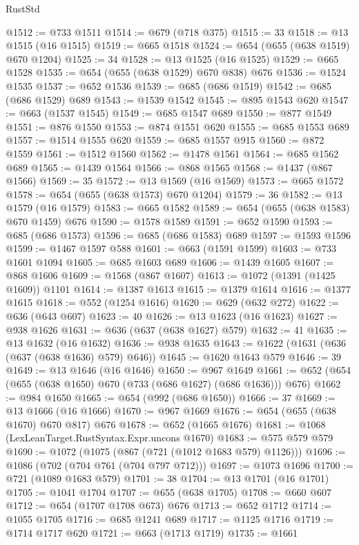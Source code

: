 \begin{lexlean}{RustStd}
\begin{coremodule}
@1512 := @733 @1511
@1514 := @679 (@718 @375)
@1515 := 33
@1518 := @13 @1515 (@16 @1515)
@1519 := @665 @1518
@1524 := @654 (@655 (@638 @1519) @670 @1204)
@1525 := 34
@1528 := @13 @1525 (@16 @1525)
@1529 := @665 @1528
@1535 := @654 (@655 (@638 @1529) @670 @838) @676
@1536 := @1524 @1535
@1537 := @652 @1536
@1539 := @685 (@686 @1519)
@1542 := @685 (@686 @1529) @689
@1543 := @1539 @1542
@1545 := @895 @1543 @620
@1547 := @663 (@1537 @1545)
@1549 := @685 @1547 @689
@1550 := @877 @1549
@1551 := @876 @1550
@1553 := @874 @1551 @620
@1555 := @685 @1553 @689
@1557 := @1514 @1555 @620
@1559 := @685 @1557 @915
@1560 := @872 @1559
@1561 := @1512 @1560
@1562 := @1478 @1561
@1564 := @685 @1562 @689
@1565 := @1439 @1564
@1566 := @868 @1565
@1568 := @1437 (@867 @1566)
@1569 := 35
@1572 := @13 @1569 (@16 @1569)
@1573 := @665 @1572
@1578 := @654 (@655 (@638 @1573) @670 @1204)
@1579 := 36
@1582 := @13 @1579 (@16 @1579)
@1583 := @665 @1582
@1589 := @654 (@655 (@638 @1583) @670 @1459) @676
@1590 := @1578 @1589
@1591 := @652 @1590
@1593 := @685 (@686 @1573)
@1596 := @685 (@686 @1583) @689
@1597 := @1593 @1596
@1599 := @1467 @1597 @588
@1601 := @663 (@1591 @1599)
@1603 := @733 @1601 @1094
@1605 := @685 @1603 @689
@1606 := @1439 @1605
@1607 := @868 @1606
@1609 := @1568 (@867 @1607)
@1613 := @1072 (@1391 (@1425 @1609)) @1101
@1614 := @1387 @1613
@1615 := @1379 @1614
@1616 := @1377 @1615
@1618 := @552 (@1254 @1616)
@1620 := @629 (@632 @272)
@1622 := @636 (@643 @607)
@1623 := 40
@1626 := @13 @1623 (@16 @1623)
@1627 := @938 @1626
@1631 := @636 (@637 (@638 @1627) @579)
@1632 := 41
@1635 := @13 @1632 (@16 @1632)
@1636 := @938 @1635
@1643 := @1622 (@1631 (@636 (@637 (@638 @1636) @579) @646))
@1645 := @1620 @1643 @579
@1646 := 39
@1649 := @13 @1646 (@16 @1646)
@1650 := @967 @1649
@1661 := @652 (@654 (@655 (@638 @1650) @670 (@733 (@686 @1627) (@686 @1636))) @676)
@1662 := @984 @1650
@1665 := @654 (@992 (@686 @1650))
@1666 := 37
@1669 := @13 @1666 (@16 @1666)
@1670 := @967 @1669
@1676 := @654 (@655 (@638 @1670) @670 @817) @676
@1678 := @652 (@1665 @1676)
@1681 := @1068 (LexLeanTarget.RustSyntax.Expr.uncons @1670)
@1683 := @575 @579 @579
@1690 := @1072 (@1075 (@867 (@721 (@1012 @1683 @579) @1126)))
@1696 := @1086 (@702 (@704 @761 (@704 @797 @712)))
@1697 := @1073 @1696
@1700 := @721 (@1089 @1683 @579)
@1701 := 38
@1704 := @13 @1701 (@16 @1701)
@1705 := @1041 @1704
@1707 := @655 (@638 @1705)
@1708 := @660 @607
@1712 := @654 (@1707 @1708 @673) @676
@1713 := @652 @1712
@1714 := @1055 @1705
@1716 := @685 @1241 @689
@1717 := @1125 @1716
@1719 := @1714 @1717 @620
@1721 := @663 (@1713 @1719)
@1735 := @1661

\end{coremodule}
\end{lexlean}
